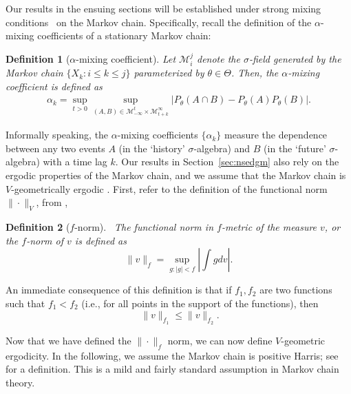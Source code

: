 \documentclass[11pt]{amsart}
\newtheorem{defn}{Definition}[section]
\begin{document}
Our results in the ensuing sections will be established under strong mixing conditions~\cite{bradley} on the Markov chain. Specifically, recall the definition of the $\alpha$-mixing coefficients of a stationary Markov chain:
\begin{defn}[{$\alpha$-mixing coefficient}] 
Let $\mathcal{M}_i^j$ denote the $\sigma$-field generated by the Markov chain $\{X_k : i\leq k\leq j\}$ parameterized by $\theta \in \Theta$. Then, the $\alpha$-mixing coefficient is defined as    
\begin{align}
    \alpha_k = \underset{t>0}{\sup}\underset{(A,B)\in \mathcal{M}_{-\infty}^t \times \mathcal{M}_{t+k}^{\infty} }{\sup} \left|P_{\theta}(A\cap B)-P_{\theta}(A)P_{\theta}(B)\right|.
\end{align}
\end{defn}
Informally speaking, the $\alpha$-mixing coefficients $\{\alpha_k\}$ measure the dependence between any two events $A$ (in the `history' $\sigma$-algebra) and $B$ (in the `future' $\sigma$-algebra) with a time lag $k$. Our results in Section~\ref{sec:nsedgm} also rely on the ergodic properties of the Markov chain, and we assume that the Markov chain is $V$-geometrically ergodic \cite[Chapter 15]{meyntweedie}. First, refer to the definition of the functional norm $\|\cdot\|_V$, from ,

\begin{defn}[{$f$-norm}]~\label{define:v-norm}The functional norm in $f$-metric of the measure $v$, or the {\it $f$-norm} of $v$ is defined as
\begin{equation}
    \|v\|_f=\underset{g:|g|<f}{\sup} \left|\int g dv \right|.
\end{equation}
\end{defn}

 An immediate consequence of this definition is that if $f_1, f_2$ are two functions such that $f_1 < f_2$ (i.e., for all points in the support of the functions), then
\begin{equation}~\label{equation:f-norm-monotone}
    \|v\|_{f_1}\leq\|v\|_{f_2}.
\end{equation} 

Now that we have defined the $\|\cdot\|_f$ norm, we can now define $V$-geometric ergodicity. In the following, we assume the Markov chain is positive Harris; see~\cite{meyntweedie} for a definition. This is a mild and fairly standard assumption in Markov chain theory.
\end{document}
